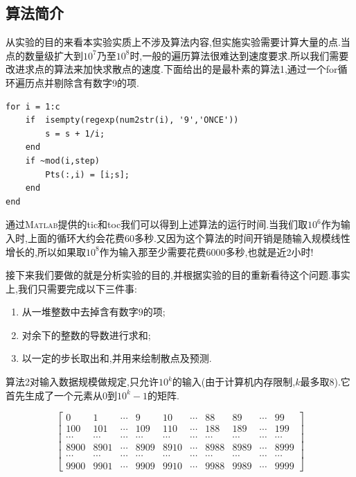 \documentclass[a4paper,12pt]{article}
\begin{document}
\begin{CJK*}{UTF8}{gbsn}
\subsection{算法简介}
从实验的目的来看本实验实质上不涉及算法内容,但实施实验需要计算大量的点.当点的数量级扩大到$10^7$乃至$10^8$时,一般的遍历算法很难达到速度要求.所以我们需要改进求点的算法来加快求散点的速度.下面给出的是最朴素的算法1,通过一个for循环遍历点并剔除含有数字9的项.\par
\vspace{-11pt}
\begin{lstlisting}
for i = 1:c
    if  isempty(regexp(num2str(i), '9','ONCE'))
        s = s + 1/i;
    end
    if ~mod(i,step)
        Pts(:,i) = [i;s];
    end
end
\end{lstlisting}
\vspace{7pt}
通过\textsc{Matlab}提供的tic和toc我们可以得到上述算法的运行时间.当我们取$10^6$作为输入时,上面的循环大约会花费60多秒.又因为这个算法的时间开销是随输入规模线性增长的,所以如果取$10^8$作为输入那至少需要花费6000多秒,也就是近2小时!\par
接下来我们要做的就是分析实验的目的,并根据实验的目的重新看待这个问题.事实上,我们只需要完成以下三件事:\par
\begin{enumerate}
\item 从一堆整数中去掉含有数字$9$的项;
\item 对余下的整数的导数进行求和;
\item 以一定的步长取出和,并用来绘制散点及预测.
\end{enumerate}\par
算法2对输入数据规模做规定,只允许$10^k$的输入(由于计算机内存限制,$k$最多取$8$).它首先生成了一个元素从$0$到$10^k-1$的矩阵.

\[
\begin{bmatrix}0&1&\cdots&9&10&\cdots&88&89&\cdots&99\\ 100&101&\cdots&109&110&\cdots&188&189&\cdots&199\\\cdots&\cdots&\cdots&\cdots&\cdots&\cdots&\cdots&\cdots&\cdots&\cdots\\8900&8901&\cdots&8909&8910&\cdots&8988&8989&\cdots&8999\\\cdots&\cdots&\cdots&\cdots&\cdots&\cdots&\cdots&\cdots&\cdots&\cdots\\9900&9901&\cdots&9909&9910&\cdots&9988&9989&\cdots&9999
\end{bmatrix}
\]\vspace{4pt}


\end{CJK*}
\end{document}

